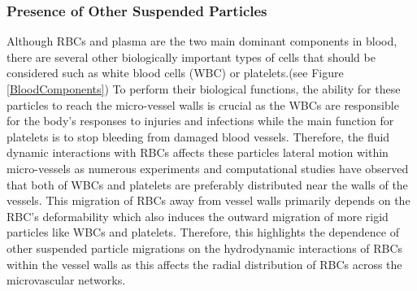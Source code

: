 \subsubsection{Presence of Other Suspended Particles}
\noindent Although RBCs and plasma are the two main dominant components in blood, there are several other biologically important types of cells that should be considered such as white blood cells (WBC) or platelets.(see Figure \ref{BloodComponents}) To perform their biological functions, the ability for these particles to reach the micro-vessel walls is crucial as the WBCs are responsible for the body's responses to injuries and infections while the main function for platelets is to stop bleeding from damaged blood vessels. Therefore, the fluid dynamic interactions with RBCs affects these particles lateral motion within micro-vessels as numerous experiments\cite{GoldsmithHarryL1984Moli, NobisU1985Rdow, TangelderG1985} and computational studies\cite{FedosovDmitryA2014Wbcm, FreundJonathanB2007Lmia, VahidkhahKoohyar2014PDiT, MehrabadiMarmar2015ACMf, PhysRevLett.108.028104} have observed that both of WBCs and platelets are preferably distributed near the walls of the vessels. This migration of RBCs away from vessel walls primarily depends on the RBC's deformability which also induces the outward migration of more rigid particles like WBCs and platelets.\cite{PhysRevLett.109.108102} Therefore, this highlights the dependence of other suspended particle migrations on the hydrodynamic interactions of RBCs within the vessel walls as this affects the radial distribution of RBCs across the microvascular networks.

